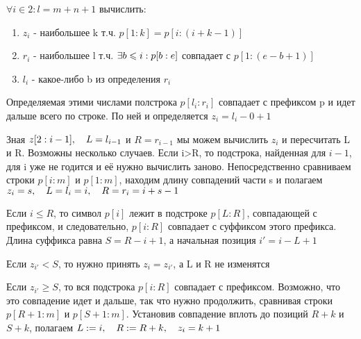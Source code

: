 \documentclass[discrete.tex]{subfiles}
\begin{document}
  \begin{aalg}
    $\forall i \in 2: l=m+n+1$ вычислить:
    \begin{enumerate}
      \item $z_i$ - наибольшее k т.ч. $p[1:k] = p[i:(i+k-1)]$
      \item $r_i$ - наибольшее l т.ч. $\exists b \leqslant i: p[b:e]$ совпадает с $p[1:(e-b+1)]$
      \item $l_i$ - какое-либо b из определения $r_i$
    \end{enumerate}
    Определяемая этими числами полстрока $p[l_i:r_i]$ совпадает с префиксом p и идет дальше всего по строке. По ней и определяется $z_i=l_i-0+1$

    Зная $z[2:i-1],\quad L = l_{i-1}$ и $R=r_{i-1}$ мы можем вычислить $z_i$ и пересчитать L и R. Возможны несколько случаев. Если i>R, то подстрока, найденная для $i-1$, для i уже не годится и её нужно вычислить заново. Непосредственно сравниваем строки $p[i:m]$ и $p[1:m]$, находим длину совпадений части s и полагаем $z_i = s,\quad L=l_i=i,\quad R=r_i=i+s-1$

    Если $i \leq R$, то символ $p[i]$ лежит в подстроке $p[L:R]$, совпадающей с префиксом, и следовательно, $p[i:R]$ совпадает с суффиксом этого префикса. Длина суффикса равна $S=R-i+1$, а начальная позиция $i'=i-L+1$

    Если $z_{i'}<S$, то нужно принять $z_i=z_{i'}$, а L и R не изменятся

    Если $z_{i'}\geq S$, то вся подстрока $p[i:R]$ совпадает с префиксом. Возможно, что это совпадение идет и дальше, так что нужно продолжить, сравнивая строки $p[R+1:m]$ и $p[S+1:m]$. Установив совпадение вплоть до позиций $R+k$ и $S+k$, полагаем $L := i,\quad R := R+k,\quad z_i = k+1$
  \end{aalg}
\end{document}
